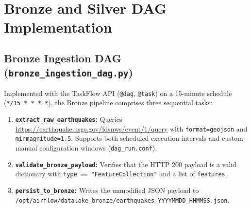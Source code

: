 \section{Bronze and Silver DAG Implementation}

\subsection{Bronze Ingestion DAG (\texttt{bronze\_ingestion\_dag.py})}
Implemented with the TaskFlow API (\texttt{@dag}, \texttt{@task}) on a 15-minute schedule (\texttt{*/15 * * * *}), the Bronze pipeline comprises three sequential tasks:
\begin{enumerate}
    \item \textbf{\texttt{extract\_raw\_earthquakes}:} Queries \url{https://earthquake.usgs.gov/fdsnws/event/1/query} with \texttt{format=geojson} and \texttt{minmagnitude=1.5}. Supports both scheduled execution intervals and custom manual configuration windows (\texttt{dag\_run.conf}).
    \item \textbf{\texttt{validate\_bronze\_payload}:} Verifies that the HTTP 200 payload is a valid dictionary with \texttt{type == "FeatureCollection"} and a list of \texttt{features}.
    \item \textbf{\texttt{persist\_to\_bronze}:} Writes the unmodified JSON payload to \texttt{/opt/airflow/datalake\_bronze/}\allowbreak\texttt{earthquakes\_YYYYMMDD\_HHMMSS.json}.
\end{enumerate}

